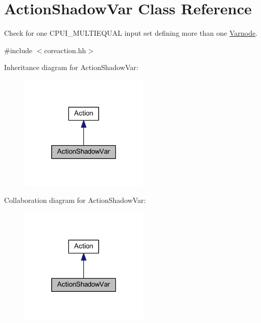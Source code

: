 \hypertarget{class_action_shadow_var}{}\section{Action\+Shadow\+Var Class Reference}
\label{class_action_shadow_var}


Check for one C\+P\+U\+I\+\_\+\+M\+U\+L\+T\+I\+E\+Q\+U\+AL input set defining more than one \mbox{\hyperlink{class_varnode}{Varnode}}.  




{\ttfamily \#include $<$coreaction.\+hh$>$}



Inheritance diagram for Action\+Shadow\+Var\+:
\nopagebreak
\begin{figure}[H]
\begin{center}
\leavevmode
\includegraphics[width=174pt]{class_action_shadow_var__inherit__graph}
\end{center}
\end{figure}


Collaboration diagram for Action\+Shadow\+Var\+:
\nopagebreak
\begin{figure}[H]
\begin{center}
\leavevmode
\includegraphics[width=174pt]{class_action_shadow_var__coll__graph}
\end{center}
\end{figure}
